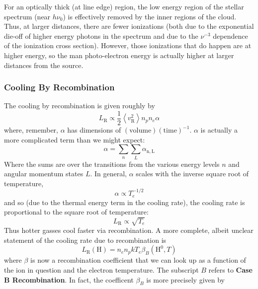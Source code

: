 \documentclass[10pt]{article}
\numberwithin{equation}{section}
\newcommand{\n}{\noindent}
\newcommand{\avg}[1]{\left\langle#1\right\rangle}
\begin{document}
\n For an optically thick (at line edge) region, the low energy region of the
stellar spectrum (near $h\nu_0$) is effectively removed by the inner regions of
the cloud. Thus, at larger distances, there are fewer ionizations (both due to
the exponential die-off of higher energy photons in the spectrum and due to the
$\nu^{-3}$ dependence of the ionization cross section). However, those
ionizations that do happen are at higher energy, so the man photo-electron
energy is actually higher at larger distances from the source.
\subsubsection{Cooling By Recombination} %
\label{sub:cooling_by_recombination}
The cooling by recombination is given roughly by
\begin{equation}
  \label{eq:h2:10} L_{\mathrm{R}} \propto \frac{1}{2}\avg{v_{\mathrm{R}}^2}
  n_pn_e \alpha
\end{equation}
where, remember, $\alpha$ has dimensions of $(\mathrm{volume})
(\mathrm{time})^{-1}$. $\alpha$ is actually a more complicated term than we
might expect:
\begin{equation}
  \label{eq:h2:11} \alpha = \sum_n\sum_L\alpha_{\mathrm{n,L}}
\end{equation}
Where the sums are over the transitions from the various energy levels $n$ and
angular momentum states $L$. In general, $\alpha$ scales with the inverse
square root of temperature,
\begin{equation}
  \label{eq:h2:12} \alpha\propto T_e^{-1/2}
\end{equation}
and so (due to the thermal energy term in the cooling rate), the cooling rate
is proportional to the square root of temperature:
\begin{equation}
  \label{eq:hw:13} L_{\mathrm{R}} \propto \sqrt{T_e}
\end{equation}
Thus hotter gasses cool faster via recombination. A more complete, albeit
unclear statement of the cooling rate due to recombination is
\begin{equation}
  \label{eq:h2:14} L_{\mathrm{R}}(\mathrm{H}) = n_e n_p kT_e
  \beta_{B}(\mathrm{H}^0, T)
\end{equation}
where $\beta$ is now a recombination coefficient that we can look up as a
function of the ion in question and the electron temperature. The subscript $B$
refers to \textbf{Case B Recombination}. In fact, the coefficent $\beta_B$ is
more precisely given by
\end{document}
